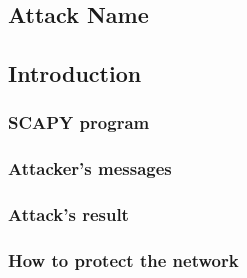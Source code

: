 \subsection{Attack Name}
\subsection{Introduction}


\subsubsection{SCAPY program}
%

\subsubsection{Attacker's messages}

\subsubsection{Attack's result}


\subsubsection{How to protect the network}
